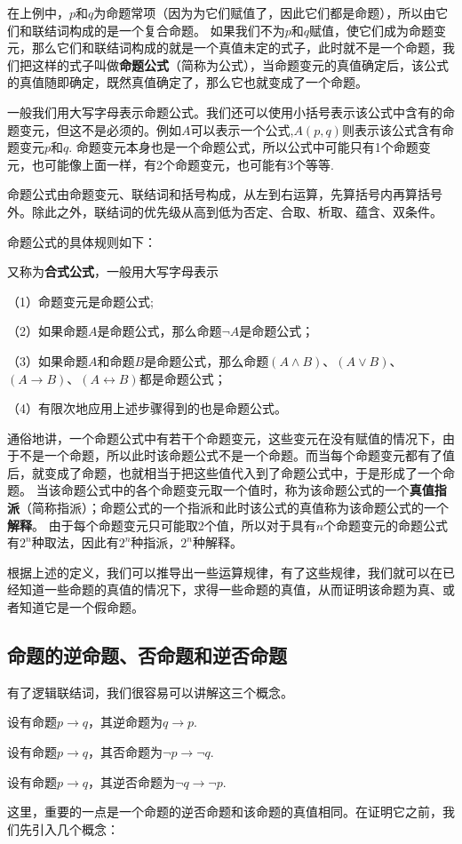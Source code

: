 在上例中，$p$和$q$为命题常项（因为为它们赋值了，因此它们都是命题），所以由它们和联结词构成的是一个复合命题。
如果我们不为$p$和$q$赋值，使它们成为命题变元，那么它们和联结词构成的就是一个真值未定的式子，此时就不是一个命题，我们把这样的式子叫做\textbf{命题公式}（简称为公式），当命题变元的真值确定后，该公式的真值随即确定，既然真值确定了，那么它也就变成了一个命题。

一般我们用大写字母表示命题公式。我们还可以使用小括号表示该公式中含有的命题变元，但这不是必须的。例如$A$可以表示一个公式,$A(p,q)$则表示该公式含有命题变元$p$和$q$.
命题变元本身也是一个命题公式，所以公式中可能只有1个命题变元，也可能像上面一样，有2个命题变元，也可能有3个等等.

命题公式由命题变元、联结词和括号构成，从左到右运算，先算括号内再算括号外。除此之外，联结词的优先级从高到低为否定、合取、析取、蕴含、双条件。

命题公式的具体规则如下：
\begin{definition}[命题公式]
    又称为\textbf{合式公式}，一般用大写字母表示

    （1）命题变元是命题公式;

    （2）如果命题$A$是命题公式，那么命题$\neg A$是命题公式；

    （3）如果命题$A$和命题$B$是命题公式，那么命题$(A \wedge B)$、$(A \vee B)$、$(A \to B)$、$(A \leftrightarrow B)$都是命题公式；
    
    （4）有限次地应用上述步骤得到的也是命题公式。
\end{definition}

通俗地讲，一个命题公式中有若干个命题变元，这些变元在没有赋值的情况下，由于不是一个命题，所以此时该命题公式不是一个命题。而当每个命题变元都有了值后，就变成了命题，也就相当于把这些值代入到了命题公式中，于是形成了一个命题。
当该命题公式中的各个命题变元取一个值时，称为该命题公式的一个\textbf{真值指派}（简称指派）；命题公式的一个指派和此时该公式的真值称为该命题公式的一个\textbf{解释}。
由于每个命题变元只可能取2个值，所以对于具有$n$个命题变元的命题公式有$2^n$种取法，因此有$2^n$种指派，$2^n$种解释。

根据上述的定义，我们可以推导出一些运算规律，有了这些规律，我们就可以在已经知道一些命题的真值的情况下，求得一些命题的真值，从而证明该命题为真、或者知道它是一个假命题。

\subsection{命题的逆命题、否命题和逆否命题}
有了逻辑联结词，我们很容易可以讲解这三个概念。 
\begin{definition}[逆命题]
    设有命题$p \to q$，其逆命题为$q \to p$.
\end{definition}
\begin{definition}[否命题]
    设有命题$p \to q$，其否命题为$\neg p \to \neg q$.
\end{definition}
\begin{definition}[逆否命题]
    设有命题$p \to q$，其逆否命题为$\neg q \to \neg p$.
\end{definition}
这里，重要的一点是一个命题的逆否命题和该命题的真值相同。在证明它之前，我们先引入几个概念：

